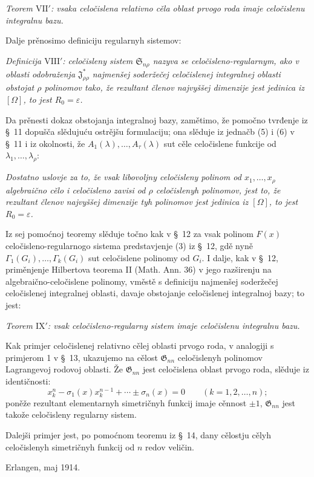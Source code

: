 \documentclass[11pt]{article}
\providecommand{\Ssys}{\mathfrak{S}}
\providecommand{\Jdom}{\mathfrak{J}}
\providecommand{\Gdom}{\mathfrak{G}}
\providecommand{\eps}{\varepsilon}
\begin{document}
{\itshape Teorem $\mathrm{VII}'$: vsaka celočislena relativno cěla oblast prvogo roda imaje celočislenu integralnu bazu.}

Dalje prěnosimo definiciju regularnyh sistemov:

{\itshape Definicija $\mathrm{VIII}'$: celočisleny sistem $\Ssys_{n\rho}$ nazyva se celočisleno-regularnym, ako v oblasti odobraženja $\Jdom^*_{\rho\rho}$ najmenšej soderžečej celočislenej integralnej oblasti obstojat $\rho$ polinomov tako, že rezultant členov najvyššej dimenzije jest jedinica iz $[\Omega]$, to jest $R_0=\eps$.}

Da prěnesti dokaz obstojanja integralnoj bazy, zamětimo, že pomočno tvrđenje iz \S\ 11 dopušča slědujuću ostrějšu formulaciju; ona slěduje iz jednačb (5) i (6) v \S\ 11 i iz okolnosti, že $A_1(\lambda),\ldots,A_\tau(\lambda)$ sut cěle celočislene funkcije od $\lambda_1,\ldots,\lambda_\rho$:

{\itshape Dostatno uslovje za to, že vsak libovoljny celočisleny polinom od $x_1,\ldots,x_\rho$ algebraično cělo i celočisleno zavisi od $\rho$ celočislenyh polinomov, jest to, že rezultant členov najvyššej dimenzije tyh polinomov jest jedinica iz $[\Omega]$, to jest $R_0=\eps$.}

Iz sej pomoćnoj teoremy slěduje točno kak v \S\ 12 za vsak polinom $F(x)$ celočisleno-regularnogo sistema predstavjenje (3) iz \S\ 12, gdě nyně $\Gamma_1(G_i),\ldots,\Gamma_k(G_i)$ sut celočislene polinomy od $G_i$. I dalje, kak v \S\ 12, priměnjenje Hilbertova teorema II (Math. Ann. 36) v jego razširenju na algebraično-celočislene polinomy, vměstě s definiciju najmenšej soderžečej celočislenej integralnej oblasti, davaje obstojanje celočislenej integralnoj bazy; to jest:

{\itshape Teorem $\mathrm{IX}'$: vsak celočisleno-regularny sistem imaje celočislenu integralnu bazu.}

Kak primjer celočislenej relativno cělej oblasti prvogo roda, v analogiji s primjerom 1 v \S\ 13, ukazujemo na cělost $\Gdom_{nn}$ celočislenyh polinomov Lagrangevoj rodovoj oblasti. Že $\Gdom_{nn}$ jest celočislena oblast prvogo roda, slěduje iz identičnosti:
\[
  x_k^n-\sigma_1(x)x_k^{n-1}+\cdots\pm\sigma_n(x)=0
  \qquad(k=1,2,\ldots,n);
\]
poněže rezultant elementarnyh simetričnyh funkcij imaje cěnnost $\pm1$, $\Gdom_{nn}$ jest takože celočisleny regularny sistem.

Dalejši primjer jest, po pomoćnom teoremu iz \S\ 14, dany cělostju cělyh celočislenyh simetričnyh funkcij od $n$ redov veličin.

Erlangen, maj 1914.
\end{document}
